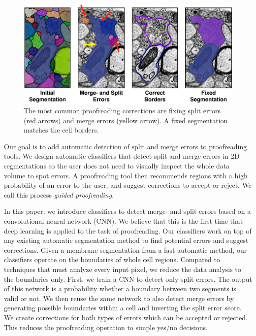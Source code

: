 \begin{figure}[t]
\begin{center}
  \includegraphics[width=\linewidth]{gfx/merge_and_split_errors.png}
\end{center}
\vspace{-4mm}
   \caption{The most common proofreading corrections are fixing split errors (red arrows) and merge errors (yellow arrow). A fixed segmentation matches the cell borders.}
\label{fig:merge_and_slit_errors}
\end{figure}

Our goal is to add automatic detection of split and merge errors to proofreading tools. We design automatic classifiers that detect split and merge errors in 2D segmentations so the user does not need to visually inspect the whole data volume to spot errors. A proofreading tool then recommends regions with a high probability of an error to the user, and suggest corrections to accept or reject. We call this process \textit{guided proofreading}.

In this paper, we introduce classifiers to detect merge- and split errors based on a convolutional neural network (CNN). We believe that this is the first time that deep learning is applied to the task of proofreading. Our classifiers work on top of any existing automatic segmentation method to find potential errors and suggest corrections. Given a membrane segmentation from a fast automatic method, our classifiers operate on the boundaries of whole cell regions. Compared to techniques that must analyze every input pixel, we reduce the data analysis to the boundaries only. First, we train a CNN to detect only split errors. The output of this network is a probability whether a boundary between two segments is valid or not. We then reuse the same network to also detect merge errors by generating possible boundaries within a cell and inverting the split error score. We create corrections for both types of errors which can be accepted or rejected. This reduces the proofreading operation to simple yes/no decisions.

